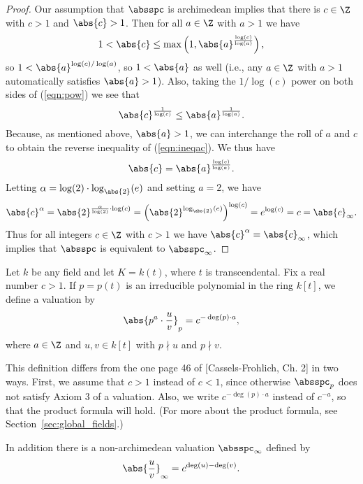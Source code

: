 \documentclass[11pt]{book}
\begin{document}
\begin{ch}
\begin{proof}
Our assumption that $\absspc$ is archimedean implies
that there is $c\in\Z$ with $c>1$ and $\abs{c}>1$.
Then for all $a\in\Z$ with $a>1$ we have
\begin{equation}\label{eqn:pow}
  1 < \abs{c} \leq
  \max\left(1,\abs{a}^{\frac{\log(c)}{\log(a)}}\right),
\end{equation}
so $1<\abs{a}^{\log(c)/\log(a)}$, so
$1<\abs{a}$ as well (i.e., any $a\in\Z$ with
$a>1$ automatically satisfies $\abs{a}>1$).  Also, taking the
$1/\log(c)$ power on both sides of (\ref{eqn:pow})
we see that
\begin{equation}\label{eqn:ineqac}
  \abs{c}^{\frac{1}{\log(c)}}
    \leq   \abs{a}^{\frac{1}{\log(a)}}.
\end{equation}
Because, as mentioned above, $\abs{a}>1$, we can interchange the roll
of $a$ and $c$ to obtain the reverse inequality of (\ref{eqn:ineqac}).
We thus have
$$
  \abs{c}
    =   \abs{a}^{\frac{\log(c)}{\log(a)}}.
$$ Letting $\alpha=\log(2)\cdot \log_{\abs{2}}(e)$ and setting $a=2$,
we have
$$
  \abs{c}^{\alpha} = \abs{2}^{\frac{\alpha}{\log(2)}\cdot \log(c)}
      = \left(\abs{2}^{\log_{\abs{2}}(e)}\right)^{\log(c)} =
   e^{\log(c)} = c = \abs{c}_\infty.
$$
Thus for all integers $c\in\Z$ with $c>1$ we have
$\abs{c}^{\alpha} = \abs{c}_{\infty}$, which implies
that $\absspc$ is equivalent to $\absspc_\infty$.
\end{proof}

Let $k$ be any field and let $K=k(t)$, where $t$
is transcendental.  Fix a real number $c>1$.
If $p=p(t)$ is an irreducible
polynomial in the ring $k[t]$, we define a valuation
by
\begin{equation}\label{eqn:ffabsp}
  \abs{p^a \cdot \frac{u}{v}}_p = c^{-\deg(p)\cdot a},
\end{equation}
where $a\in\Z$ and $u,v\in k[t]$ with
$p\nmid u$ and $p\nmid v$.
\begin{remark}
This definition differs from the one page 46 of [Cassels-Frohlich,
Ch. 2] in two ways.   First, we assume that $c>1$ instead
of $c<1$, since otherwise $\absspc_p$ does not satisfy
Axiom 3 of a valuation.  Also, we write $c^{-\deg(p)\cdot a}$
instead of $c^{-a}$, so that the product formula will
hold.  (For more about the product formula, see
Section~\ref{sec:global_fields}.)
\end{remark}
In addition there is a non-archimedean valuation
$\absspc_\infty$ defined by
\begin{equation}\label{eqn:ffabsoo}
  \abs{\frac{u}{v}}_\infty = c^{\deg(u)-\deg(v)}.
\end{equation}



\end{ch}
\end{document}
